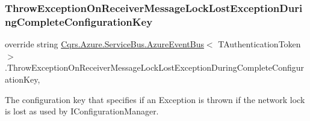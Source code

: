 \subsubsection{\texorpdfstring{Throw\+Exception\+On\+Receiver\+Message\+Lock\+Lost\+Exception\+During\+Complete\+Configuration\+Key}{ThrowExceptionOnReceiverMessageLockLostExceptionDuringCompleteConfigurationKey}}
{\footnotesize\ttfamily override string \hyperlink{classCqrs_1_1Azure_1_1ServiceBus_1_1AzureEventBus}{Cqrs.\+Azure.\+Service\+Bus.\+Azure\+Event\+Bus}$<$ T\+Authentication\+Token $>$.Throw\+Exception\+On\+Receiver\+Message\+Lock\+Lost\+Exception\+During\+Complete\+Configuration\+Key\hspace{0.3cm}{\ttfamily [get]}, {\ttfamily [protected]}}



The configuration key that specifies if an Exception is thrown if the network lock is lost as used by I\+Configuration\+Manager. 

